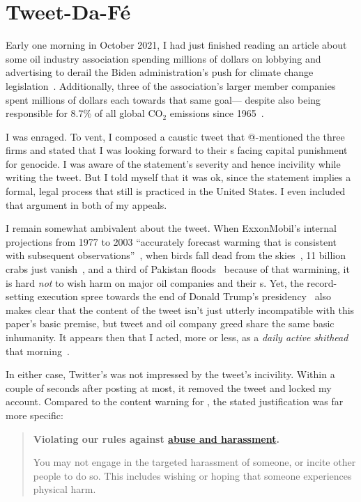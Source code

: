 \section{Tweet-Da-F\'e}
\label{sec:tweet-da-fe}

Early one morning in October 2021, I had just finished reading an article about
some oil industry association spending millions of dollars on lobbying and
advertising to derail the Biden administration's push for climate change
legislation~\cite{Tabuchi2021}. Additionally, three of the association's larger
member companies spent millions of dollars each towards that same goal---%
despite also being responsible for 8.7\% of all global CO$_2$ emissions since
1965~\cite{TaylorWatts2019}.

I was enraged. To vent, I composed a caustic tweet that @-mentioned the three
firms and stated that I was looking forward to their s facing capital
punishment for genocide. I was aware of the statement's severity and hence
incivility while writing the tweet. But I told myself that it was ok, since the
statement implies a formal, legal process that still is practiced in the United
States. I even included that argument in both of my appeals.

I remain somewhat ambivalent about the tweet. When ExxonMobil's internal
projections from 1977 to 2003 ``accurately forecast warming that is consistent
with subsequent observations''~\cite{SupranRahmstorf2023}, when birds fall dead
from the skies~\cite{Dave2022}, 11 billion crabs just
vanish~\cite{Olmstead2022}, and a third of Pakistan floods~\cite{Chughtai2022}
because of that warmining, it is hard \emph{not} to wish harm on major oil
companies and their s. Yet, the record-setting execution spree towards
the end of Donald Trump's
presidency~\cite{Arnsdorf2020,Kovarsky2022,SuebsaengReis2023} also makes clear
that the content of the tweet isn't just utterly incompatible with this paper's
basic premise, but tweet and oil company greed share the same basic inhumanity.
It appears then that I acted, more or less, as a \emph{daily active shithead}
that morning~\cite{Sherman2021}.

In either case, Twitter's  was not impressed by the tweet's incivility.
Within a couple of seconds after posting at most, it removed the tweet and
locked my account. Compared to the content warning for \DALLE, the stated
justification was far more specific:

\begin{quote}
\openfat\textbf{Violating our rules against
\href{https://web.archive.org/web/20220905021323/https://help.twitter.com/en/rules-and-policies/abusive-behavior}{abuse
and harassment}.}

You may not engage in the targeted harassment of someone, or incite other people
to do so. This includes wishing or hoping that someone experiences physical
harm.\closefat{}
\end{quote}

